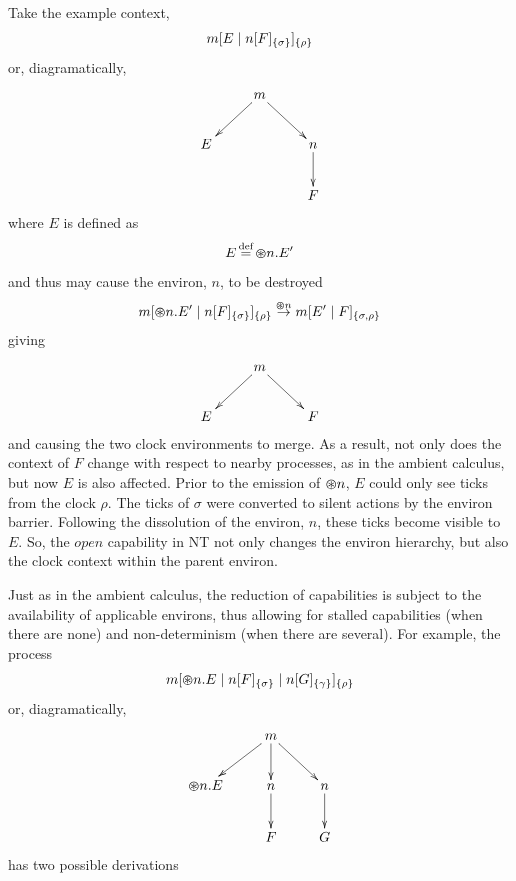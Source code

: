 Take the example context,
\begin{equation}
{m}[ E \;|\; {n}[ F ]_{\{\sigma\}} ]_{\{\rho\}}
\end{equation}
or, diagramatically,
\[\CompileMatrices
\xymatrix{
&
m \ar@{->}[ld] \ar@{->}[rd] & \\
E & & n \ar@{->}[d] \\
& & F
}
\]
where $E$ is defined as
\begin{equation}
E \operatorname{\stackrel{\textrm{def}}{=}} \varoast n.E^\prime
\end{equation}
and thus may cause the environ, $n$, to be destroyed
\begin{equation}
{m}[ \varoast n.E^\prime \;|\; {n}[ F ]_{\{\sigma\}} ]_{\{\rho\}} \stackrel{\varoast n}{\rightarrow}
{m}[ E^\prime \;|\; F ]_{\{\sigma, \rho\}}
\end{equation}
giving
\[\CompileMatrices
\xymatrix{
&
m \ar@{->}[ld] \ar@{->}[rd] & \\
E & & F
}
\]
and causing the two clock environments to merge.  As a result, not
only does the context of $F$ change with respect to nearby processes,
as in the ambient calculus, but now $E$ is also affected.  Prior to
the emission of $\varoast n$, $E$ could only see ticks from the clock
$\rho$.  The ticks of $\sigma$ were converted to silent actions by the
environ barrier.  Following the dissolution of the environ, $n$, these
ticks become visible to $E$.  So, the $open$ capability in NT not only
changes the environ hierarchy, but also the clock context within the
parent environ.

Just as in the ambient calculus, the reduction of capabilities is
subject to the availability of applicable environs, thus allowing for
stalled capabilities (when there are none) and non-determinism (when
there are several). For example, the process
\begin{equation}
{m}[ \varoast n.E \;|\; {n}[ F ]_{\{\sigma\}} \;|\; {n}[ G ]_{\{\gamma\}} ]_{\{\rho\}}
\end{equation}
or, diagramatically,
\[\CompileMatrices
\xymatrix{
&
m \ar@{->}[ld] \ar@{->}[d] \ar@{->}[rd] & \\
\tntopen{n}.E & n \ar@{->}[d] & n \ar@{->}[d] \\
& F & G
}
\]
has two possible derivations

